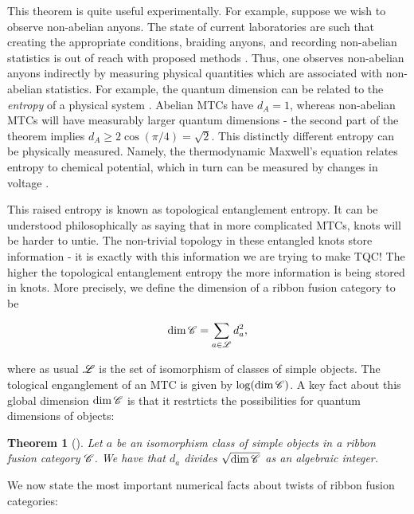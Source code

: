 \documentclass{article}
\newtheorem{theorem}{Theorem}[section]
\theoremstyle{definition}
\numberwithin{figure}{section}
\begin{document}
This theorem is quite useful experimentally. For example, suppose we wish to observe non-abelian anyons. The state of current laboratories are such that creating the appropriate conditions, braiding anyons, and recording non-abelian statistics is out of reach with proposed methods \cite{bonderson2006probing}. Thus, one observes non-abelian anyons indirectly by measuring physical quantities which are associated with non-abelian statistics. For example, the quantum dimension can be related to the \textit{entropy} of a physical system \cite{kitaev2006topological}. Abelian MTCs have $d_A=1$, whereas non-abelian MTCs will have measurably larger quantum dimensions - the second part of the theorem implies $d_A\geq 2\cos(\pi/4)=\sqrt{2}$. This distinctly different entropy can be physically measured. Namely, the thermodynamic Maxwell's equation relates entropy to chemical potential, which in turn can be measured by changes in voltage \cite{cooper2009observable}.

This raised entropy is known as topological entanglement entropy. It can be understood philosophically as saying that in more complicated MTCs, knots will be harder to untie. The non-trivial topology in these entangled knots store information - it is exactly with this information we are trying to make TQC! The higher the topological entanglement entropy the more information is being stored in knots. More precisely, we define the dimension of a ribbon fusion category to be

$$\dim \mathscr{C} = \sum_{a\in \mathscr{L}} d_a^2,$$

where as usual $\mathscr{L}$ is the set of isomorphism of classes of simple objects. The tological enganglement of an MTC is given by $\log (\dim \mathscr{C})$. A key fact about this global dimension $\dim\mathscr{C}$ is that it restrticts the possibilities for quantum dimensions of objects:

\begin{theorem}[\cite{etingof1997some}] Let $a$ be an isomorphism class of simple objects in  a ribbon fusion category $\mathscr{C}$. We have that $d_a$ divides $\sqrt{\dim \mathscr{C}}$ as an algebraic integer.
\end{theorem}

We now state the most important numerical facts about twists of ribbon fusion categories:
\end{document}
